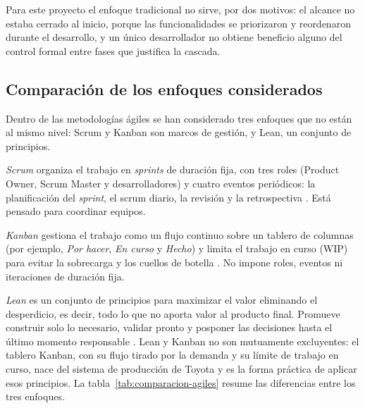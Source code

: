 Para este proyecto el enfoque tradicional no sirve, por dos motivos: el alcance no estaba cerrado al inicio, porque las funcionalidades se priorizaron y reordenaron durante el desarrollo, y un único desarrollador no obtiene beneficio alguno del control formal entre fases que justifica la cascada.

\subsection{Comparación de los enfoques considerados}

Dentro de las metodologías ágiles se han considerado tres enfoques que no están al mismo nivel: Scrum y Kanban son marcos de gestión, y Lean, un conjunto de principios.

\textit{Scrum} organiza el trabajo en \textit{sprints} de duración fija, con tres roles (Product Owner, Scrum Master y desarrolladores) y cuatro eventos periódicos: la planificación del \textit{sprint}, el scrum diario, la revisión y la retrospectiva \citep{ScrumGuide2020}. Está pensado para coordinar equipos.

\textit{Kanban} gestiona el trabajo como un flujo continuo sobre un tablero de columnas (por ejemplo, \textit{Por hacer}, \textit{En curso} y \textit{Hecho}) y limita el trabajo en curso (WIP) para evitar la sobrecarga y los cuellos de botella \citep{Anderson2010}. No impone roles, eventos ni iteraciones de duración fija.

\textit{Lean} es un conjunto de principios para maximizar el valor eliminando el desperdicio, es decir, todo lo que no aporta valor al producto final. Promueve construir solo lo necesario, validar pronto y posponer las decisiones hasta el último momento responsable \citep{Poppendieck2003}. Lean y Kanban no son mutuamente excluyentes: el tablero Kanban, con su flujo tirado por la demanda y su límite de trabajo en curso, nace del sistema de producción de Toyota \citep{Ohno1988} y es la forma práctica de aplicar esos principios. La tabla~\ref{tab:comparacion-agiles} resume las diferencias entre los tres enfoques.


